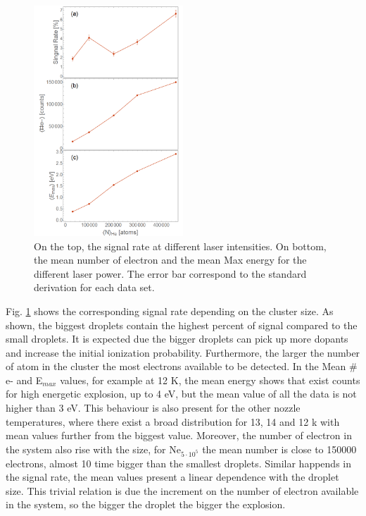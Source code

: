  \begin{figure}[h!]
\centering
\includegraphics[width=0.5\textwidth]{../Images/results/NI_He_Dropletsize/Alltogether.png} 
\caption[NIR He intensity dependence. Signal Rate and Mean Values)]{On the top, the signal rate at different laser intensities. On bottom, the mean number of electron and the mean Max energy for the different laser power. The error bar correspond to the standard derivation for each data set.}
\label{fig:NIRsizeHEall}
\end{figure}

Fig. \ref{fig:NIRsizeHEall} shows the corresponding signal rate depending on the cluster size. As shown, the biggest droplets contain the highest percent of signal compared to the small droplets. It is expected due the bigger droplets can pick up more dopants and increase the initial ionization probability. Furthermore, the larger the number of atom in the cluster the most electrons available to be detected. In the Mean $\#$e- and E$_{max}$ values, for example at 12 K, the mean energy shows that exist counts for high energetic explosion, up to 4 eV, but the mean value of all the data is not higher than 3 eV. This behaviour is also present for the other nozzle temperatures, where there exist a broad distribution for 13, 14 and 12 k with mean values further from the biggest value.
Moreover, the number of electron in the system also rise with the size, for Ne$_{5\cdot10^5}$ the mean number is close to 150000 electrons, almost 10 time bigger than the smallest droplets. Similar happends in the signal rate, the mean values present a linear dependence with the droplet size. This trivial relation is due the increment on the number of electron available in the system, so the bigger the droplet the bigger the explosion. 


